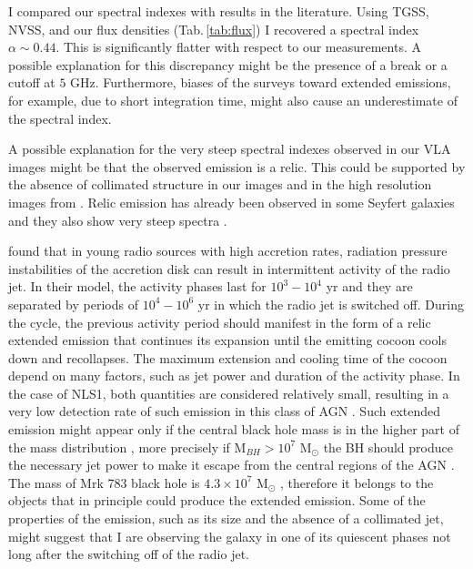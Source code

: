\documentclass[../thesis.tex]{subfiles}
\begin{document}
I compared our spectral indexes with results in the literature.
Using TGSS, NVSS, and our flux densities (Tab.\,\ref{tab:flux}) I recovered a spectral index $\alpha\sim 0.44$.
This is significantly flatter with respect to our measurements.
A possible explanation for this discrepancy might be the presence of a break or a cutoff at $5$ GHz.
Furthermore, biases of the surveys toward extended emissions, for example, due to short integration time, might also cause an underestimate of the spectral index.

A possible explanation for the very steep spectral indexes observed in our VLA images might be that the observed emission is a relic.
This could be supported by the absence of collimated structure in our images and in the high resolution images from \citet{Doi13}.
Relic emission has already been observed in some Seyfert galaxies \citep[e.g., NGC 4235,][]{Kharb16} and they also show very steep spectra \citep[e.g.,][]{Jamrozy04,Kharb16}.

\citet{Czerny09} found that in young radio sources with high accretion rates, radiation pressure instabilities of the accretion disk can result in intermittent activity of the radio jet.
In their model, the activity phases last for $10^3-10^4$ yr and they are separated by periods of $10^4-10^6$ yr in which the radio jet is switched off.
During the cycle, the previous activity period should manifest in the form of a relic extended emission that continues its expansion until the emitting cocoon cools down and recollapses.
The maximum extension and cooling time of the cocoon depend on many factors, such as jet power and duration of the activity phase.
In the case of NLS1, both quantities are considered relatively small, resulting in a very low detection rate of such emission in this class of AGN \citep{Czerny09,Foschini15}. 
Such extended emission might appear only if the central black hole mass is in the higher part of the mass distribution \citep[which spans between $10^6$ to $10^8$ M$_{\odot}$, e.g.,][]{Cracco16}, more precisely if M$_{BH}>10^7$ M$_{\odot}$ the BH should produce the necessary jet power to make it escape from the central regions of the AGN \citep{Doi12}.
The mass of Mrk 783 black hole is $4.3\times10^7$ M$_{\odot}$ \citep{Berton15a}, therefore it belongs to the objects that in principle could produce the extended emission.
Some of the properties of the emission, such as its size and the absence of a collimated jet, might suggest that I are observing the galaxy in one of its quiescent phases not long after the switching off of the radio jet.
\end{document}
